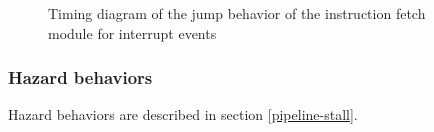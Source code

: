 \begin{figure}[H]
    \centering
    
    \caption{Timing diagram of the jump behavior of the instruction fetch module for interrupt events}
    \label{fig:ifm-behavior-interrupt}
\end{figure}

\subsubsection{Hazard behaviors}

\begin{content}
  Hazard behaviors are described in section \ref{pipeline-stall}.
\end{content}

\newpage